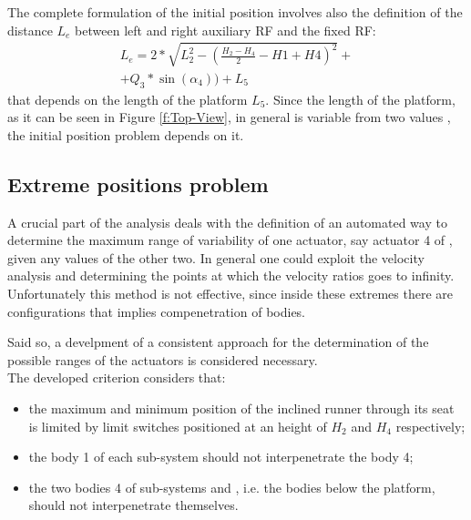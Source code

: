 \documentclass[10.5pt, twocolumn]{article}
\newcommand*\circled[1]{\tikz[baseline=(char.base)]{
	\node[shape=circle,draw,inner sep=2pt] (char) {#1};}}
\begin{document}
The complete formulation of the initial position involves also the definition of the distance \( L_e \) between left and right auxiliary RF and the fixed RF:
\begin{multline}
  L_e = 2*\sqrt{L_2^2-(\frac{H_2-H_4}{2}-H1+H4)^2}+\\
  + Q_3*\sin(\alpha_4)) + L_5
\end{multline}
that depends on the length of the platform \( L_5 \). Since the length of the platform, as it can be seen in Figure \ref{f:Top-View}, in general is variable from two values \cite{aVDS}, the initial position problem depends on it.

\subsection{Extreme positions problem}
\label{s:Extreme-positions}
A crucial part of the analysis deals with the definition of an automated way to determine the maximum range of variability of one actuator, say actuator 4 of \circled{B}, given any values of the other two. In general one could exploit the velocity analysis and determining the points at which the velocity ratios goes to infinity. Unfortunately this method is not effective, since inside these extremes there are configurations that implies compenetration of bodies.

Said so, a develpment of a consistent approach for the determination of the possible ranges of the actuators is considered necessary.\\
The developed criterion considers that:
\begin{itemize}
  \item the maximum and minimum position of the inclined runner through its seat is limited by limit switches positioned at an height of \( H_2 \) and \( H_4 \) respectively;
  \item the body 1 of each sub-system should not interpenetrate the body 4;
  \item the two bodies 4 of sub-systems \circled{A} and \circled{B}, i.e. the bodies below the platform, should not interpenetrate themselves.
\end{itemize}
\end{document}
